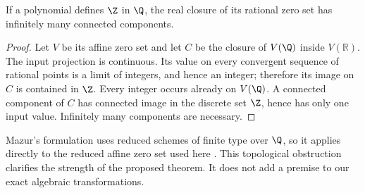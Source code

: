 \begin{proposition}
If a polynomial defines $\Z$ in $\Q$, the real closure of its rational
zero set has infinitely many connected components.
\end{proposition}
\begin{proof}
Let $V$ be its affine zero set and let $C$ be the closure of $V(\Q)$
inside $V(\mathbb R)$. The input projection is continuous. Its value
on every convergent sequence of rational points is a limit of integers,
and hence an integer; therefore its image on $C$ is contained in $\Z$.
Every integer occurs already on $V(\Q)$. A connected component of
$C$ has connected image in the discrete set $\Z$, hence has only one
input value. Infinitely many components are necessary.
\end{proof}

Mazur's formulation uses reduced schemes of finite type over $\Q$,
so it applies directly to the reduced affine zero set used here
\cite[Section 1 and Conjecture 3]{Mazur1995}. This topological obstruction
clarifies the strength of the proposed theorem. It does not add a
premise to our exact algebraic transformations.
